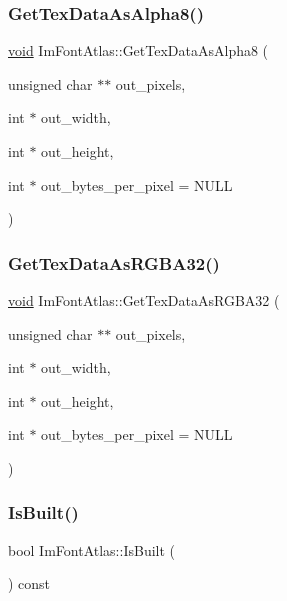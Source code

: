 \subsubsection{\texorpdfstring{Get\+Tex\+Data\+As\+Alpha8()}{GetTexDataAsAlpha8()}}
{\footnotesize\ttfamily \hyperlink{imgui__impl__opengl3__loader_8h_ac668e7cffd9e2e9cfee428b9b2f34fa7}{void} Im\+Font\+Atlas\+::\+Get\+Tex\+Data\+As\+Alpha8 (\begin{DoxyParamCaption}\item[{unsigned char $\ast$$\ast$}]{out\+\_\+pixels,  }\item[{int $\ast$}]{out\+\_\+width,  }\item[{int $\ast$}]{out\+\_\+height,  }\item[{int $\ast$}]{out\+\_\+bytes\+\_\+per\+\_\+pixel = {\ttfamily NULL} }\end{DoxyParamCaption})}

\mbox{\label{structImFontAtlas_a8abb0c4e67ebb38249d4df71218c4eec}} 
\subsubsection{\texorpdfstring{Get\+Tex\+Data\+As\+R\+G\+B\+A32()}{GetTexDataAsRGBA32()}}
{\footnotesize\ttfamily \hyperlink{imgui__impl__opengl3__loader_8h_ac668e7cffd9e2e9cfee428b9b2f34fa7}{void} Im\+Font\+Atlas\+::\+Get\+Tex\+Data\+As\+R\+G\+B\+A32 (\begin{DoxyParamCaption}\item[{unsigned char $\ast$$\ast$}]{out\+\_\+pixels,  }\item[{int $\ast$}]{out\+\_\+width,  }\item[{int $\ast$}]{out\+\_\+height,  }\item[{int $\ast$}]{out\+\_\+bytes\+\_\+per\+\_\+pixel = {\ttfamily NULL} }\end{DoxyParamCaption})}

\mbox{\label{structImFontAtlas_a142ba1470099bbd4b67bdb47be92d475}} 
\subsubsection{\texorpdfstring{Is\+Built()}{IsBuilt()}}
{\footnotesize\ttfamily bool Im\+Font\+Atlas\+::\+Is\+Built (\begin{DoxyParamCaption}{ }\end{DoxyParamCaption}) const\hspace{0.3cm}{\ttfamily [inline]}}

